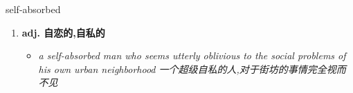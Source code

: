 
\begin{frame}
{\huge self-absorbed}
\begin{center}
\begin{enumerate}\Large
  \item \textbf{adj. 自恋的,自私的}
  \begin{itemize}
    \item \em{\Large{a self-absorbed man who seems utterly oblivious to the social problems of his own urban neighborhood 一个超级自私的人,对于街坊的事情完全视而不见}}
  \end{itemize}
\end{enumerate}
\end{center}
\end{frame}
